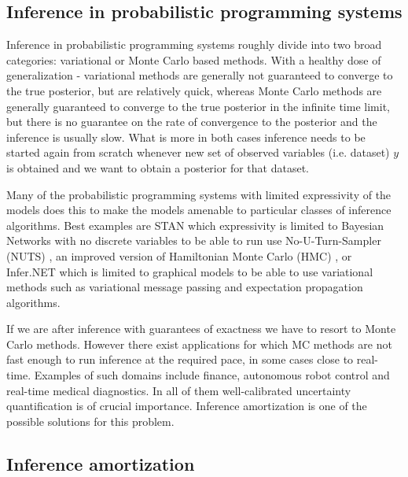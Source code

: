 \documentclass[12pt]{article}
\begin{document}


\subsection{Inference in probabilistic programming systems}
Inference in probabilistic programming systems roughly divide into two broad categories: variational or Monte Carlo based methods.
With a healthy dose of generalization - variational methods are generally not guaranteed to converge to the true posterior, but are relatively quick, whereas Monte Carlo methods are generally guaranteed to converge to the true posterior in the infinite time limit, but there is no guarantee on the rate of convergence to the posterior and the inference is usually slow.
What is more in both cases inference needs to be started again from scratch whenever new set of observed variables (i.e. dataset) $y$ is obtained and we want to obtain a posterior for that dataset.  

Many of the probabilistic programming systems with limited expressivity of the models does this to make the models amenable to particular classes of inference algorithms. 
Best examples are STAN which expressivity is limited to Bayesian Networks with no discrete variables to be able to run use No-U-Turn-Sampler (NUTS) \citep{NUTS}, an improved version of Hamiltonian Monte Carlo (HMC) \citep{HMC}, or Infer.NET which is limited to graphical models to be able to use variational methods such as variational message passing \citep{variationalmessagepassing} and expectation propagation \citep{EP} algorithms.

If we are after inference with guarantees of exactness we have to resort to Monte Carlo methods.
However there exist applications for which MC methods are not fast enough to run inference at the required pace, in some cases close to real-time.
Examples of such domains include finance, autonomous robot control and real-time medical diagnostics.
In all of them well-calibrated uncertainty quantification is of crucial importance.
Inference amortization is one of the possible solutions for this problem.


\subsection{Inference amortization}
\end{document}
